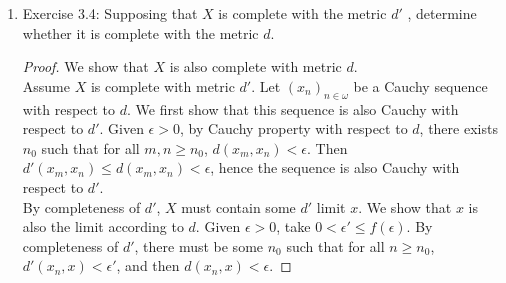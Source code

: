 \documentclass{article}
\begin{document}
\begin{enumerate}
\begin{proof}
      Finally, we can prove the statement using K\"{o}nig's Lemma. Let
      $\mathcal{C}=(\sigma_i)_{i\in\omega}\subseteq 2^{<\omega}$ define an open
      cover of the Cantor space, and assume by contradiction that no finite
      subset of set of covers the space. Let $\mathcal{T}$ be a sub-tree
      of $2^\omega$ consisting of exactly the nodes whose children are not
      covered by any finite subset of $\mathcal{C}$. This sub-tree is
      infinite because each level of $2^\omega$ must contain at least one
      node in $\mathcal{T}$ otherwise $\mathcal{C}$ would finitely cover
      the Cantor space. The sub-tree is also connected because for each
      node in $\mathcal{T}$, its parent node must also be in $\mathcal{T}$.
      Hence by K\"{o}nig's Lemma, $\mathcal{T}$ must contain an infinite
      path. From our construction of $\mathcal{T}$, this path cannot be
      covered by any cover in $\mathcal{C}$, which contradicts
      $\mathcal{C}$ being a cover of the Cantor space.
    \end{proof}

  \item Exercise 3.4: Supposing that $X$ is complete with the metric $d'$ ,
    determine whether it is complete with the metric $d$.
    \begin{proof}
      We show that $X$ is also complete with metric $d$. \\

      Assume $X$ is complete with metric $d'$. Let $(x_n)_{n\in\omega}$ be
      a Cauchy sequence with respect to $d$. We first show that this
      sequence is also Cauchy with respect to $d'$. Given $\epsilon>0$, by
      Cauchy property with respect to $d$, there exists $n_0$ such that for
      all $m,n\geq n_0$, $d(x_m,x_n)<\epsilon$. Then
      $d'(x_m,x_n)\leq d(x_m,x_n)<\epsilon$, hence the sequence is also Cauchy
      with respect to $d'$. \\

      By completeness of $d'$, $X$ must contain some $d'$ limit $x$. We
      show that $x$ is also the limit according to $d$. Given $\epsilon>0$,
      take $0<\epsilon'\leq f(\epsilon)$. By completeness of $d'$, there
      must be some $n_0$ such that for all $n\geq n_0$,
      $d'(x_n,x)<\epsilon'$, and then $d(x_n,x)<\epsilon$.
    \end{proof}
\end{enumerate}
\end{document}
